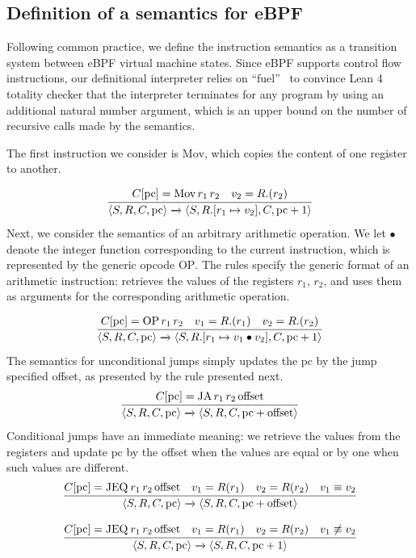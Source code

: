 \documentclass[sigconf]{acmart}
\begin{document}
\subsection{Definition of a semantics for eBPF}

Following common practice, we define the instruction semantics as a transition system between eBPF virtual machine states. Since eBPF supports control flow instructions, our definitional interpreter relies on ``fuel''~\cite{McBride15} to convince Lean 4 totality checker that the interpreter terminates for any program by using an additional natural number argument, which is an upper bound on the number of recursive calls made by the semantics.

The first instruction we consider is $\mathrm{Mov}$, which copies the content of one 
register to another.

\[
    \infer
        { \langle S, R, C, \mathrm{pc} \rangle \xrightarrow{} \langle S, R.[r_1 \mapsto v_2], C, \mathrm{pc} + 1 \rangle }
        { C[\mathrm{pc}] = \mathrm{Mov} \, r_1 \, r_2 \quad v_2 = R.(r_2) }
\]
Next, we consider the semantics of an arbitrary arithmetic operation. We let $\bullet$ denote the integer function corresponding to the current instruction, which is represented by the generic opcode $\mathrm{OP}$. The rules specify the generic format of an arithmetic instruction: retrieves the values of the registers $r_1$, $r_2$, and uses them as arguments for the corresponding arithmetic operation.

\[
    \infer
        { \langle S, R, C, \mathrm{pc} \rangle \xrightarrow{} \langle S, R.[r_1 \mapsto v_1 \bullet v_2], C, \mathrm{pc} + 1 \rangle }
        { C[\mathrm{pc}] = \mathrm{OP} \, r_1 \, r_2 \quad v_1 = R.(r_1) \quad v_2 = R.(r_2) }
\]
The semantics for unconditional jumps simply updates the $\mathrm{pc}$ by the jump specified offset, as presented by the rule presented next.
\[
    \infer
        { \langle S, R, C, \mathrm{pc} \rangle \xrightarrow{} \langle S, R, C, \mathrm{pc} + \mathrm{offset} \rangle }
        { C[\mathrm{pc}] = \mathrm{JA} \, r_1 \, r_2 \, \mathrm{offset} }
\]
Conditional jumps have an immediate meaning: we retrieve the values from the registers and update $\mathrm{pc}$ by the offset when the values are equal or by one when such values are different.
\[
    \begin{array}{c}
    \infer
        { \langle S, R, C, \mathrm{pc} \rangle \xrightarrow{} \langle S, R, C, \mathrm{pc} + \mathrm{offset} \rangle }
        { C[\mathrm{pc}] = \mathrm{JEQ}\:r_1 \, r_2 \, \mathrm{offset} \quad v_1 = R(r_1) \quad v_2 = R(r_2) \quad v_1 \equiv v_2 } \\ \\ 
    \infer
        { \langle S, R, C, \mathrm{pc} \rangle \xrightarrow{} \langle S, R, C, \mathrm{pc} + 1 \rangle }
        { C[\mathrm{pc}] = \mathrm{JEQ}\:r_1 \, r_2 \, \mathrm{offset} \quad v_1 = R(r_1) \quad v_2 = R(r_2) \quad v_1 \not\equiv v_2 }
    \end{array}
\]
\end{document}
